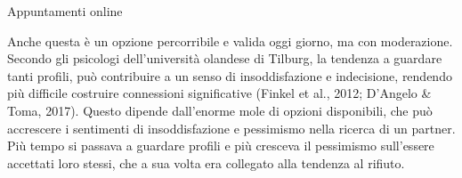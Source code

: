 \documentclass[12pt]{book} %
\begin{document}
\begin{mdframed}[linewidth=1pt]
Appuntamenti online

Anche questa è un opzione percorribile e valida oggi giorno, ma con moderazione. Secondo gli psicologi dell'università
olandese di Tilburg, la  tendenza a guardare tanti profili, può contribuire a un senso di insoddisfazione e indecisione, rendendo più difficile costruire connessioni significative (Finkel et al., 2012; D’Angelo \& Toma, 2017). Questo dipende dall'enorme mole di opzioni disponibili, che può accrescere i sentimenti
di insoddisfazione e pessimismo nella ricerca di un partner. Più tempo si passava a guardare profili e più cresceva il
pessimismo sull'essere accettati loro stessi, che a sua volta era collegato alla tendenza al rifiuto.
\end{mdframed}
\end{document}

